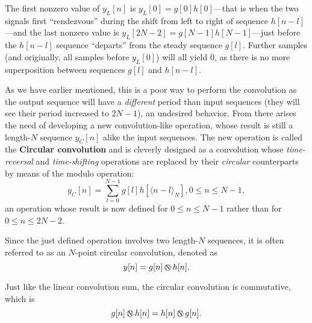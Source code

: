 \documentclass[\documentfontsize, twocolumn]{\classname}
\begin{document}
The first nonzero value of $y_L[n]$ is $y_L[0] = g[0]h[0]$---that is when the two signals first ``rendezvous'' during the shift from left to right of sequence $h[n-l]$---and the last nonzero value is $y_L[2N-2] = g[N-1]h[N-1]$---just before the $h[n-l]$ sequence ``departs'' from the steady sequence $g[l]$. Further samples (and originally, all samples before $y_L[0]$) will all yield $0$, as there is no more superposition between sequences $g[l]$ and $h[n-l]$.

As we have earlier mentioned, this is a poor way to perform the convolution as the output sequence will have a \emph{different} period than input sequences (they will see their period increased to $2N-1$), an undesired behavior. From there arises the need of developing a new convolution-like operation, whose result is still a length-$N$ sequence $y_C[n]$ alike the input sequences. The new operation is called the \textbf{Circular convolution} and is cleverly designed as a convolution whose \emph{time-reversal} and \emph{time-shifting} operations are replaced by their \emph{circular} counterparts by means of the modulo operation:
\begin{equation}\label{eqn:circularConvolution}
    y_C[n] = \sum_{l=0}^{N-1} g[l]h[\langle n-l \rangle_N], 0 \leq n \leq N-1,
\end{equation}
an operation whose result is now defined for $0 \leq n \leq N-1$ rather than for $0 \leq n \leq 2N-2$.

Since the just defined operation involves two length-$N$ sequences, it is often referred to as an $N$-point circular convolution, denoted as
\begin{equation}\label{eqn:circularConvolutionSymbol}
    y[n] = g[n] \encircle{N}  h[n].
\end{equation}

Just like the linear convolution sum, the circular convolution is commutative, which is
\[
    g[n] \encircle{N} h[n] = h[n] \encircle{N} g[n].
\]
\end{document}
